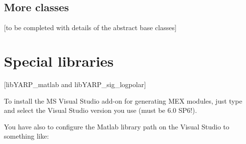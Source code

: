\subsection{More classes}
[to be completed with details of the abstract base classes]


\section{Special libraries}
[libYARP\_matlab and libYARP\_sig\_logpolar]

To install the MS Visual Studio add-on for generating MEX modules, just type  and select the Visual Studio version you use (must be 6.0 SP6!).

You have also to configure the Matlab library path on the Visual Studio to something like: 

